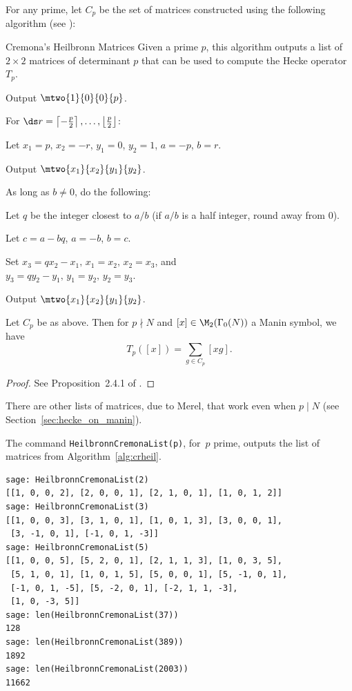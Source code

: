 For any prime, let $C_p$ be the set of matrices
constructed using the following algorithm (see \cite[\S2.4]{cremona:algs}):
\begin{algorithm}{Cremona's Heilbronn Matrices}\label{alg:crheil}
  Given a prime $p$, this algorithm outputs a list of $2\times 2$
  matrices of determinant $p$ that can be used to compute the Hecke
  operator $T_p$.
\begin{steps}
\item Output $\mtwo{1}{0}{0}{p}$.
\item For $\ds r = \left\lceil -\frac{p}{2} \right\rceil, \ldots, 
                   \left\lfloor \frac{p}{2} \right\rfloor$:
\begin{steps}
\item Let $x_1 = p$, $x_2 = -r$, $y_1 = 0$, $y_2 = 1$, $a=-p$, $b=r$.
\item Output $\mtwo{x_1}{x_2}{y_1}{y_2}$.
\item As long as $b\neq 0$, do the following:
\begin{steps}
\item Let $q$ be the integer closest to $a/b$ (if $a/b$ is a half
  integer, round away from $0$).
\item Let $c=a-bq$, $a=-b$, $b=c$.
\item Set
  $x_3=qx_2 - x_1,\,  x_1 = x_2,\,  x_2 = x_3$, and\\
 $y_3=qy_2 - y_1,\,  y_1 = y_2,\,  y_2 = y_3$.
\item Output $\mtwo{x_1}{x_2}{y_1}{y_2}$.
\end{steps}
\end{steps}
\end{steps}
\end{algorithm}


\begin{proposition}
Let $C_p$ be as above. Then
for $p\nmid N$ and $[x]\in \M_2(\Gamma_0(N))$ a Manin 
symbol, we have
$$
 T_p([x]) = \sum_{g \in C_p} [xg].
$$
\end{proposition}
\begin{proof}
See Proposition~2.4.1 of \cite{cremona:algs}.
\end{proof}

There are other lists of matrices, due to Merel, that work even when
$p\mid N$ (see Section~\ref{sec:hecke_on_manin}).

The command {\tt HeilbronnCremonaList(p)}, for~$p$ prime, 
outputs the list of matrices from Algorithm~\ref{alg:crheil}.
\begin{verbatim}
sage: HeilbronnCremonaList(2)
[[1, 0, 0, 2], [2, 0, 0, 1], [2, 1, 0, 1], [1, 0, 1, 2]]
sage: HeilbronnCremonaList(3)
[[1, 0, 0, 3], [3, 1, 0, 1], [1, 0, 1, 3], [3, 0, 0, 1], 
 [3, -1, 0, 1], [-1, 0, 1, -3]]
sage: HeilbronnCremonaList(5)
[[1, 0, 0, 5], [5, 2, 0, 1], [2, 1, 1, 3], [1, 0, 3, 5], 
 [5, 1, 0, 1], [1, 0, 1, 5], [5, 0, 0, 1], [5, -1, 0, 1], 
 [-1, 0, 1, -5], [5, -2, 0, 1], [-2, 1, 1, -3], 
 [1, 0, -3, 5]]
sage: len(HeilbronnCremonaList(37))
128
sage: len(HeilbronnCremonaList(389))
1892
sage: len(HeilbronnCremonaList(2003))
11662
\end{verbatim}

